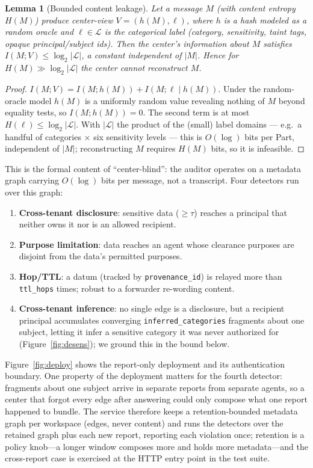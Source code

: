 \documentclass[conference,compsoc]{IEEEtran}
\newtheorem{lemma}{Lemma}
\begin{document}
\begin{lemma}[Bounded content leakage]\label{lem:blind}
Let a message $M$ (with content entropy $H(M)$) produce center-view
$V=(h(M),\ell)$, where $h$ is a hash modeled as a random oracle and
$\ell\in\mathcal{L}$ is the categorical label (category, sensitivity, taint tags,
opaque principal/subject ids). Then the center's information about $M$ satisfies
$I(M;V)\le \log_2|\mathcal{L}|$, a constant independent of $|M|$. Hence for
$H(M)\gg\log_2|\mathcal{L}|$ the center cannot reconstruct $M$.
\end{lemma}
\begin{proof}
$I(M;V)=I(M;h(M))+I(M;\ell\mid h(M))$. Under the random-oracle model $h(M)$ is a
uniformly random value revealing nothing of $M$ beyond equality tests, so
$I(M;h(M))=0$. The second term is at most $H(\ell)\le\log_2|\mathcal{L}|$. With
$|\mathcal{L}|$ the product of the (small) label domains --- e.g.\ a handful of
categories $\times$ six sensitivity levels --- this is $O(\log)$ bits per Part,
independent of $|M|$; reconstructing $M$ requires $H(M)$ bits, so it is infeasible.
\end{proof}


This is the formal content of ``center-blind'': the auditor operates on a metadata
graph carrying $O(\log)$ bits per message, not a transcript. Four detectors run
over this graph:
\begin{enumerate}
\item \textbf{Cross-tenant disclosure}: sensitive data ($\geq\tau$) reaches a
principal that neither owns it nor is an allowed recipient.
\item \textbf{Purpose limitation}: data reaches an agent whose clearance purposes
are disjoint from the data's permitted purposes.
\item \textbf{Hop/TTL}: a datum (tracked by \texttt{provenance\_id}) is relayed
more than \texttt{ttl\_hops} times; robust to a forwarder re-wording content.
\item \textbf{Cross-tenant inference}: no single edge is a disclosure, but a
recipient principal accumulates converging \texttt{inferred\_categories}
fragments about one subject, letting it infer a sensitive category it was never
authorized for (Figure~\ref{fig:desens}); we ground this in the bound below.
\end{enumerate}
Figure~\ref{fig:deploy} shows the report-only deployment and its authentication boundary. One property of the deployment matters for the fourth detector: fragments about one subject arrive in separate reports from separate agents, so a center that forgot every edge after answering could only compose what one report happened to bundle. The service therefore keeps a retention-bounded metadata graph per workspace (edges, never content) and runs the detectors over the retained graph plus each new report, reporting each violation once; retention is a policy knob---a longer window composes more and holds more metadata---and the cross-report case is exercised at the HTTP entry point in the test suite.

\end{document}
